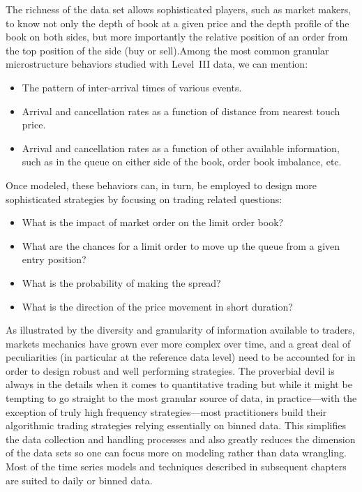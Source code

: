 The richness of the data set allows sophisticated players, such as market makers, to know not only the depth of book at a given price and the depth profile of the book on both sides, but more importantly the relative position of an order from the top position of the side (buy or sell).Among the most common granular microstructure behaviors studied with Level~III data, we can mention:
        \begin{itemize}
        \item The pattern of inter-arrival times of various events.
        \item Arrival and cancellation rates as a function of distance from nearest touch price.
        \item Arrival and cancellation rates as a function of other available information, such as in the queue on either side of the book, order book imbalance, etc.
        \end{itemize}
Once modeled, these behaviors can, in turn, be employed to design more sophisticated strategies by focusing on trading related questions:
        \begin{itemize}
        \item What is the impact of market order on the limit order book?
        \item What are the chances for a limit order to move up the queue from a given entry position?
        \item What is the probability of making the spread?
        \item What is the direction of the price movement in short duration?
        \end{itemize}


As illustrated by the diversity and granularity of information available to traders, markets mechanics have grown ever more complex over time, and a great deal of peculiarities (in particular at the reference data level) need to be accounted for in order to design robust and well performing strategies. The proverbial devil is always in the details when it comes to quantitative trading but while it might be tempting to go straight to the most granular source of data, in practice---with the exception of truly high frequency strategies---most practitioners build their algorithmic trading strategies relying essentially on binned data. This simplifies the data collection and handling processes and also greatly reduces the dimension of the data sets so one can focus more on modeling rather than data wrangling. Most of the time series models and techniques described in subsequent chapters are suited to daily or binned data.



